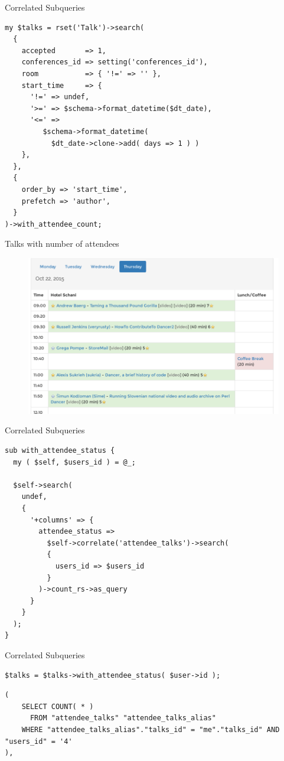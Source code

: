 \begin{frame}[fragile]{Correlated Subqueries}
\begin{lstlisting}
my $talks = rset('Talk')->search(
  {
    accepted       => 1,
    conferences_id => setting('conferences_id'),
    room           => { '!=' => '' },
    start_time     => {
      '!=' => undef,
      '>=' => $schema->format_datetime($dt_date),
      '<=' =>
         $schema->format_datetime( 
           $dt_date->clone->add( days => 1 ) )
    },
  },
  {
    order_by => 'start_time',
    prefetch => 'author',
  }
)->with_attendee_count;
\end{lstlisting}
\end{frame}

\begin{frame}{Talks with number of attendees}
\begin{figure}[!ht]
\centering
\includegraphics[width=0.8\linewidth]{img/schedule2015.png}
\end{figure}
\end{frame}

\begin{frame}[fragile]{Correlated Subqueries}
\begin{lstlisting}
sub with_attendee_status {
  my ( $self, $users_id ) = @_;

  $self->search(
    undef,
    {
      '+columns' => {
        attendee_status => 
          $self->correlate('attendee_talks')->search(
          {
            users_id => $users_id
          }
        )->count_rs->as_query
      }
    }
  );
}
\end{lstlisting}
\end{frame}

\begin{frame}[fragile]{Correlated Subqueries}
\begin{lstlisting}
$talks = $talks->with_attendee_status( $user->id );
\end{lstlisting}

\begin{lstlisting}
( 
    SELECT COUNT( * ) 
      FROM "attendee_talks" "attendee_talks_alias" 
    WHERE "attendee_talks_alias"."talks_id" = "me"."talks_id" AND "users_id" = '4'
), 
\end{lstlisting}
\end{frame}

